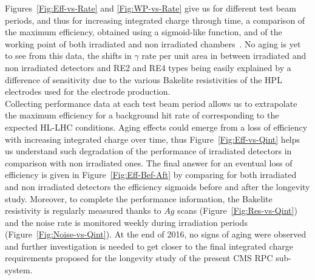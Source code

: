	Figures~\ref{Fig:Eff-vs-Rate} and \ref{Fig:WP-vs-Rate} give us for different test beam periods, and thus for increasing integrated charge through time, a comparison of the maximum efficiency, obtained using a sigmoid-like function, and of the working point of both irradiated and non irradiated chambers~\cite{ABBRESCIA2005}. No aging is yet to see from this data, the shifts in $\gamma$ rate per unit area  in between irradiated and non irradiated detectors and RE2 and RE4 types being easily explained by a difference of sensitivity due to the various Bakelite resistivities of the HPL electrodes used for the electrode production.\\
     Collecting performance data at each test beam period allows us to extrapolate the maximum efficiency for a background hit rate of  corresponding to the expected HL-LHC conditions. Aging effects could emerge from a loss of efficiency with increasing integrated charge over time, thus Figure~\ref{Fig:Eff-vs-Qint} helps us understand such degradation of the performance of irradiated detectors in comparison with non irradiated ones. The final answer for an eventual loss of efficiency is given in Figure~\ref{Fig:Eff-Bef-Aft} by comparing for both irradiated and non irradiated detectors the efficiency sigmoids before and after the longevity study. Moreover, to complete the performance information, the Bakelite resistivity is regularly measured thanks to $Ag$ scans (Figure~\ref{Fig:Res-vs-Qint}) and the noise rate is monitored weekly during irradiation periods (Figure~\ref{Fig:Noise-vs-Qint}). At the end of 2016, no signs of aging were observed and further investigation is needed to get closer to the final integrated charge requirements proposed for the longevity study of the present CMS RPC sub-system.\\
    
